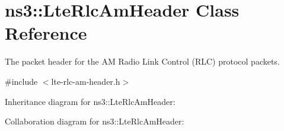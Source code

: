 \hypertarget{classns3_1_1LteRlcAmHeader}{}\section{ns3\+:\+:Lte\+Rlc\+Am\+Header Class Reference}
\label{classns3_1_1LteRlcAmHeader}


The packet header for the AM Radio Link Control (R\+LC) protocol packets.  




{\ttfamily \#include $<$lte-\/rlc-\/am-\/header.\+h$>$}



Inheritance diagram for ns3\+:\+:Lte\+Rlc\+Am\+Header\+:


Collaboration diagram for ns3\+:\+:Lte\+Rlc\+Am\+Header\+:
